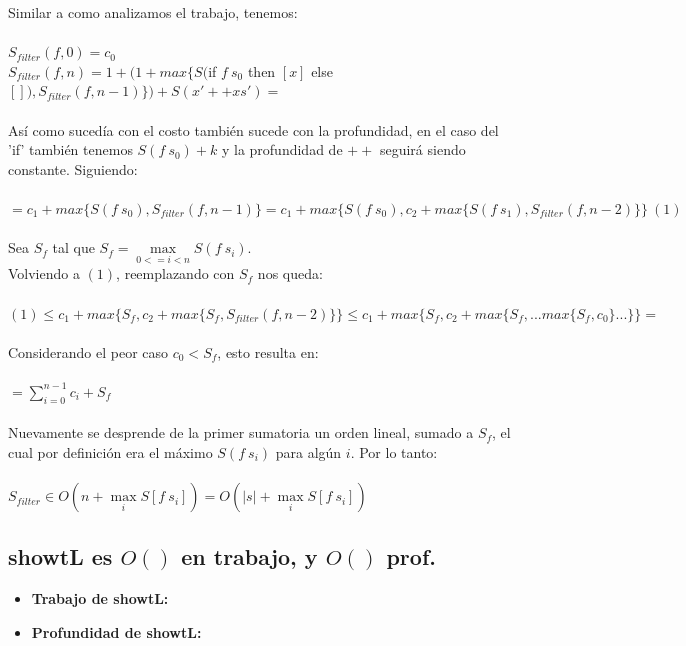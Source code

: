 \documentclass[12pt]{article}
\begin{document}
\begin{itemize}
Similar a como analizamos el trabajo, tenemos: \\
\\
    $S_{filter}(f, 0) = c_0$ \\
    $S_{filter}(f, n) = 1 + ( 1 + max\{ S($if $f\ s_0$ then $[x]$ else $[]), S_{filter}(f, n-1)\} ) + S(x'++xs') = $ \\
\\
    Así como sucedía con el costo también sucede con la profundidad, en el caso del 'if' también tenemos $S(f\ s_0) + k$ y la profundidad de $++$ seguirá siendo constante. Siguiendo:\\
\\
    $ = c_1 + max\{ S(f\ s_0), S_{filter}(f, n-1) \} = c_1 + max\{ S(f\ s_0), c_2 + max\{S(f\ s_1), S_{filter}(f, n-2) \} \} \ (1) $ \\
\\
    Sea $S_f$ tal que $S_f = \max\limits_{0<=i<n} S(f\ s_i)$. \\
    Volviendo a $(1)$, reemplazando con $S_f$ nos queda:\\
\\
    $(1) \leq 
    c_1 + max\{ S_f, c_2 + max\{S_f, S_{filter}(f, n-2) \} \} \leq 
    c_1 + max\{ S_f, c_2 + max\{S_f, ... max\{ S_f, c_0 \} ... \} \} = $\\
\\
    Considerando el peor caso $c_0 < S_f$, esto resulta en:\\
\\
    $ = \sum\limits_{i=0}^{n-1} c_i + S_f $\\
\\
    Nuevamente se desprende de la primer sumatoria un orden lineal, sumado a $S_f$, el cual por definición era el máximo $S(f\ s_i)$ para algún $i$. Por lo tanto: \\
\\
    $S_{filter} \in O(n + \max\limits_{i} S[f\ s_i] ) = O(|s| + \max\limits_{i} S[f\ s_i] )$\\
    
\end{itemize}


\subsection{showtL es $O()$ en trabajo, y $O()$ prof.}

\begin{itemize}

\item \textbf{Trabajo de showtL:}


\item \textbf{Profundidad de showtL:}
    
\end{itemize}
\end{document}
